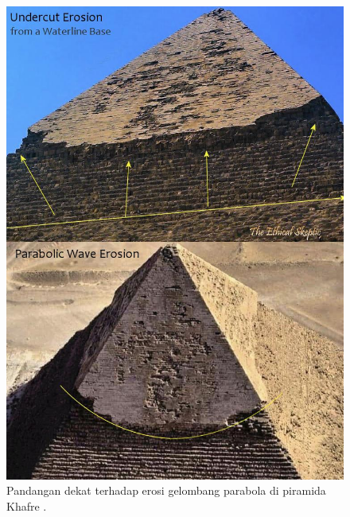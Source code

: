 \documentclass[10pt,twocolumn,letterpaper]{article}
\begin{document}
\begin{figure}[H]
\begin{center}
   \includegraphics[width=1\linewidth]{wave.jpg}
\end{center}
   \caption{Pandangan dekat terhadap erosi gelombang parabola di piramida Khafre \cite{27}.}
\label{fig:19}
\label{fig:onecol}
\end{figure}
\end{document}
